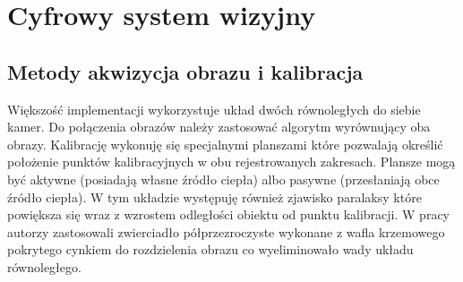 \chapter{Cyfrowy system wizyjny}
\label{cha:csw}

\section{Metody akwizycja obrazu i kalibracja}

Większość implementacji wykorzystuje układ dwóch równoległych do siebie kamer. Do połączenia obrazów należy zastosować algorytm wyrównujący oba obrazy. Kalibrację wykonuję się specjalnymi  planszami które pozwalają określić położenie punktów kalibracyjnych w obu rejestrowanych zakresach. Plansze mogą być aktywne (posiadają własne źródło ciepła) albo pasywne (przesłaniają obce źródło ciepła). W tym układzie występuję również zjawisko paralaksy które powiększa się wraz z wzrostem odległości obiektu od punktu kalibracji. W pracy  \cite{hwang2015multispectral} autorzy zastosowali zwierciadło półprzezroczyste wykonane z wafla krzemowego pokrytego cynkiem do rozdzielenia obrazu co wyeliminowało wady układu równoległego.

